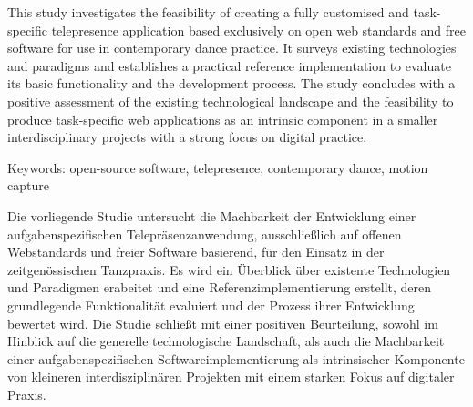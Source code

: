 
This study investigates the feasibility of creating a fully customised and task-specific telepresence application based exclusively on open web standards and free software for use in contemporary dance practice.
It surveys existing technologies and paradigms and establishes a practical reference implementation to evaluate its basic functionality and the development process.
The study concludes with a positive assessment of the existing technological landscape and the feasibility to produce task-specific web applications as an intrinsic component in a smaller interdisciplinary projects with a strong focus on digital practice.

Keywords: open-source software, telepresence, contemporary dance, motion capture
 
 Die vorliegende Studie untersucht die Machbarkeit der Entwicklung einer aufgabenspezifischen Telepräsenzanwendung, ausschließlich auf offenen Webstandards und freier Software basierend, für den Einsatz in der zeitgenössischen Tanzpraxis.
 Es wird ein Überblick über existente Technologien und Paradigmen erabeitet und eine Referenzimplementierung erstellt, deren grundlegende Funktionalität evaluiert und der Prozess ihrer Entwicklung bewertet wird.
 Die Studie schließt mit einer positiven Beurteilung, sowohl im Hinblick auf die generelle technologische Landschaft, als auch die Machbarkeit einer aufgabenspezifischen Softwareimplementierung als intrinsischer Komponente von kleineren interdisziplinären Projekten mit einem starken Fokus auf digitaler Praxis.
 